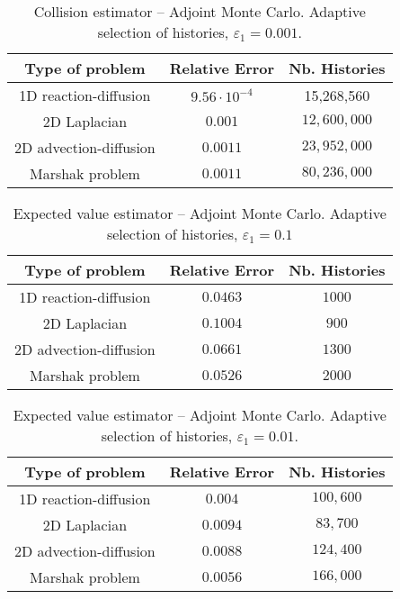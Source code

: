 \documentclass[final,leqno,onefignum,onetabnum]{siamltex1213}
\begin{document}

\begin{table}[!t]
\centering
\begin{tabular}{|c|c|c|}
\hline
\textbf{Type of problem} & \textbf{Relative Error} &\textbf{Nb. Histories}\\
\hline
1D reaction-diffusion & $9.56 \cdot 10^{-4}$ & 15,268,560 \\
\hline
2D Laplacian & $0.001$ & $12,600,000$\\
\hline
2D advection-diffusion & $0.0011$  & $23,952,000$\\
\hline
Marshak problem & $0.0011$ &  $80,236,000$\\
\hline
\end{tabular}
\caption{Collision estimator -- Adjoint Monte Carlo. Adaptive selection of histories,
$\varepsilon_1=0.001$.}
\label{tab:Adj_adapt3}
\end{table}


\begin{table}[!t]
\centering
\begin{tabular}{|c|c|c|}
\hline
\textbf{Type of problem} & \textbf{Relative Error} &\textbf{Nb. Histories}\\
\hline
1D reaction-diffusion & $0.0463$ & $1000$\\
\hline
2D Laplacian & $0.1004$ & $900$\\
\hline
2D advection-diffusion & $0.0661$  & $1300$\\
\hline
Marshak problem & $0.0526$ & $2000$\\
\hline
\end{tabular}
\caption{Expected value estimator -- Adjoint Monte Carlo. Adaptive selection of
histories,
$\varepsilon_1=0.1$}
\label{tab:Adj_adapt4}
\end{table}


\begin{table}[!t]
\centering
\begin{tabular}{|c|c|c|}
\hline
\textbf{Type of problem} & \textbf{Relative Error} &\textbf{Nb. Histories}\\
\hline
1D reaction-diffusion & $0.004$ & $100,600$\\
\hline
2D Laplacian & $0.0094$ & $83,700$\\
\hline
2D advection-diffusion & $0.0088$  & $124,400$\\
\hline
Marshak problem & $0.0056$ & $166,000$\\
\hline
\end{tabular}
\caption{Expected value estimator -- Adjoint Monte Carlo. Adaptive selection of histories,
$\varepsilon_1=0.01.$}
\label{tab:Adj_adapt5}
\end{table}
\end{document}
